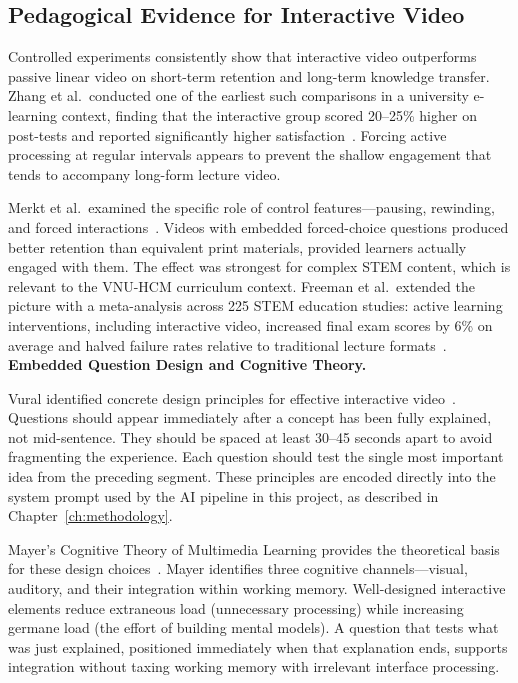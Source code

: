 \subsection{Pedagogical Evidence for Interactive Video}

Controlled experiments consistently show that interactive video outperforms passive linear video on short-term retention and long-term knowledge transfer. Zhang et al.\ conducted one of the earliest such comparisons in a university e-learning context, finding that the interactive group scored 20--25\% higher on post-tests and reported significantly higher satisfaction~\cite{zhang2006}. Forcing active processing at regular intervals appears to prevent the shallow engagement that tends to accompany long-form lecture video.

Merkt et al.\ examined the specific role of control features---pausing, rewinding, and forced interactions~\cite{merkt2011}. Videos with embedded forced-choice questions produced better retention than equivalent print materials, provided learners actually engaged with them. The effect was strongest for complex STEM content, which is relevant to the VNU-HCM curriculum context. Freeman et al.\ extended the picture with a meta-analysis across 225 STEM education studies: active learning interventions, including interactive video, increased final exam scores by 6\% on average and halved failure rates relative to traditional lecture formats~\cite{freeman2014}.
\clearpage
\textbf{Embedded Question Design and Cognitive Theory.}

Vural identified concrete design principles for effective interactive video~\cite{vural2013}. Questions should appear immediately after a concept has been fully explained, not mid-sentence. They should be spaced at least 30--45 seconds apart to avoid fragmenting the experience. Each question should test the single most important idea from the preceding segment. These principles are encoded directly into the system prompt used by the AI pipeline in this project, as described in Chapter~\ref{ch:methodology}.

Mayer's Cognitive Theory of Multimedia Learning provides the theoretical basis for these design choices~\cite{mayer2009}. Mayer identifies three cognitive channels---visual, auditory, and their integration within working memory. Well-designed interactive elements reduce extraneous load (unnecessary processing) while increasing germane load (the effort of building mental models). A question that tests what was just explained, positioned immediately when that explanation ends, supports integration without taxing working memory with irrelevant interface processing.

